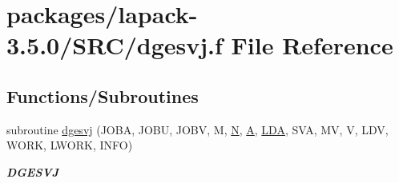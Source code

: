 \hypertarget{dgesvj_8f}{}\section{packages/lapack-\/3.5.0/\+S\+R\+C/dgesvj.f File Reference}
\label{dgesvj_8f}
\subsection*{Functions/\+Subroutines}
\begin{DoxyCompactItemize}
\item 
subroutine \hyperlink{group__doubleGEcomputational_gac14340a964d1df1b2f4483844a7c0df1}{dgesvj} (J\+O\+B\+A, J\+O\+B\+U, J\+O\+B\+V, M, \hyperlink{polmisc_8c_a0240ac851181b84ac374872dc5434ee4}{N}, \hyperlink{classA}{A}, \hyperlink{example__user_8c_ae946da542ce0db94dced19b2ecefd1aa}{L\+D\+A}, S\+V\+A, M\+V, V, L\+D\+V, W\+O\+R\+K, L\+W\+O\+R\+K, I\+N\+F\+O)
\begin{DoxyCompactList}\small\item\em {\bfseries D\+G\+E\+S\+V\+J} \end{DoxyCompactList}\end{DoxyCompactItemize}
